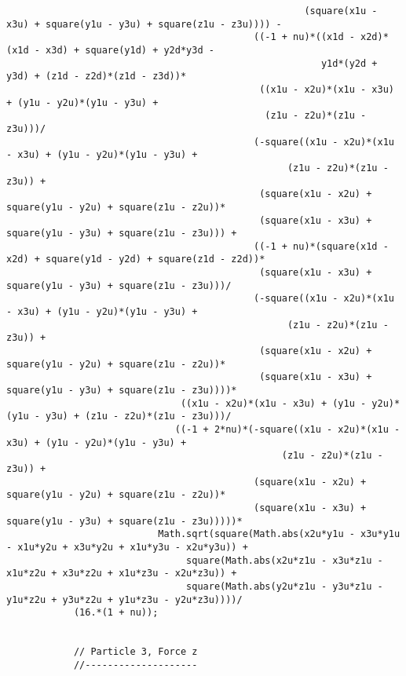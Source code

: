 \begin{lstlisting}
													 (square(x1u - x3u) + square(y1u - y3u) + square(z1u - z3u)))) - 
											((-1 + nu)*((x1d - x2d)*(x1d - x3d) + square(y1d) + y2d*y3d - 
														y1d*(y2d + y3d) + (z1d - z2d)*(z1d - z3d))*
											 ((x1u - x2u)*(x1u - x3u) + (y1u - y2u)*(y1u - y3u) + 
											  (z1u - z2u)*(z1u - z3u)))/
											(-square((x1u - x2u)*(x1u - x3u) + (y1u - y2u)*(y1u - y3u) + 
												  (z1u - z2u)*(z1u - z3u)) + 
											 (square(x1u - x2u) + square(y1u - y2u) + square(z1u - z2u))*
											 (square(x1u - x3u) + square(y1u - y3u) + square(z1u - z3u))) + 
											((-1 + nu)*(square(x1d - x2d) + square(y1d - y2d) + square(z1d - z2d))*
											 (square(x1u - x3u) + square(y1u - y3u) + square(z1u - z3u)))/
											(-square((x1u - x2u)*(x1u - x3u) + (y1u - y2u)*(y1u - y3u) + 
												  (z1u - z2u)*(z1u - z3u)) + 
											 (square(x1u - x2u) + square(y1u - y2u) + square(z1u - z2u))*
											 (square(x1u - x3u) + square(y1u - y3u) + square(z1u - z3u))))*
							   ((x1u - x2u)*(x1u - x3u) + (y1u - y2u)*(y1u - y3u) + (z1u - z2u)*(z1u - z3u)))/
							  ((-1 + 2*nu)*(-square((x1u - x2u)*(x1u - x3u) + (y1u - y2u)*(y1u - y3u) + 
												 (z1u - z2u)*(z1u - z3u)) + 
											(square(x1u - x2u) + square(y1u - y2u) + square(z1u - z2u))*
											(square(x1u - x3u) + square(y1u - y3u) + square(z1u - z3u)))))*
						   Math.sqrt(square(Math.abs(x2u*y1u - x3u*y1u - x1u*y2u + x3u*y2u + x1u*y3u - x2u*y3u)) + 
								square(Math.abs(x2u*z1u - x3u*z1u - x1u*z2u + x3u*z2u + x1u*z3u - x2u*z3u)) + 
								square(Math.abs(y2u*z1u - y3u*z1u - y1u*z2u + y3u*z2u + y1u*z3u - y2u*z3u))))/
			(16.*(1 + nu));
			
			
			// Particle 3, Force z
			//--------------------
			

\end{lstlisting}
